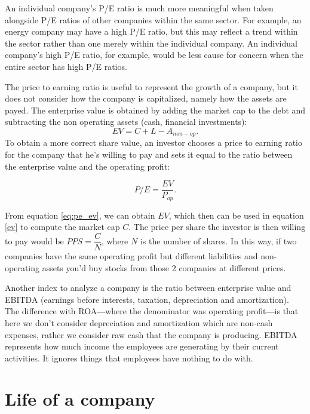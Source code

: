 An individual company’s P/E ratio is much more meaningful when taken alongside P/E ratios of other companies within the same sector. For example, an energy company may have a high P/E ratio, but this may reflect a trend within the sector rather than one merely within the individual company. An individual company’s high P/E ratio, for example, would be less cause for concern when the entire sector has high P/E ratios.

The price to earning ratio is useful to represent the growth of a company, but it does not consider how the company is capitalized, namely how the assets are payed. The enterprise value is obtained by adding the market cap to the debt and subtracting the non operating assets (cash, financial investments): 
\begin{equation}\label{ev}
    EV = C + L - A_{non-op}.
\end{equation}
To obtain a more correct share value, an investor chooses a price to earning ratio for the company that he's willing to pay and sets it equal to the ratio between the enterprise value and the operating profit:

\begin{equation}\label{eq:pe_ev}
P/E = \dfrac{EV}{P_{op}}.
\end{equation}

From equation \ref{eq:pe_ev}, we can obtain $EV$, which then can be used in equation \ref{ev} to compute the market cap $C$. The price per share the investor is then willing to pay would be $PPS = \dfrac{C}{N}$, where $N$ is the number of shares. In this way, if two companies have the same operating profit but different liabilities and non-operating assets you'd buy stocks from those 2 companies at different prices.

Another index to analyze a company is the ratio between enterprise value and EBITDA (earnings before interests, taxation, depreciation and amortization). The difference with ROA―where the denominator was operating profit―is that here we don't consider depreciation and amortization which are non-cash expenses, rather we consider raw cash that the company is producing. EBITDA represents how much income the employees are generating by their current activities. It ignores things that employees have nothing to do with.

\section{Life of a company} \label{Life of a company}

